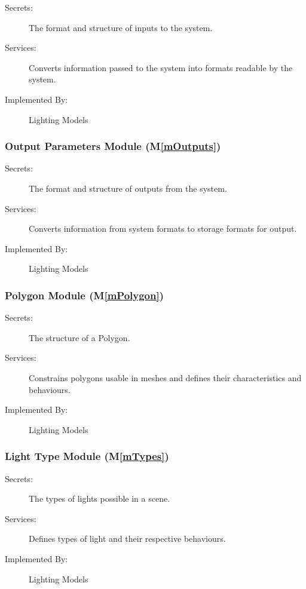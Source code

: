 \documentclass[12pt, titlepage]{article}
\newcommand{\mref}[1]{M\ref{#1}}
\begin{document}
\begin{description}
	\item[Secrets:]The format and structure of inputs to the system.
	\item[Services:]Converts information passed to the system into formats 
	readable by the system.
	\item[Implemented By:] Lighting Models
\end{description}

\subsubsection{Output Parameters Module (\mref{mOutputs})}

\begin{description}
	\item[Secrets:]The format and structure of outputs from the system.
	\item[Services:]Converts information from system formats to storage formats 
	for output.
	\item[Implemented By:] Lighting Models
\end{description}

\subsubsection{Polygon Module (\mref{mPolygon})}
\begin{description}
	\item[Secrets:]The structure of a Polygon.
	\item[Services:]Constrains polygons usable in meshes and defines their 
	characteristics and behaviours.
	\item[Implemented By:] Lighting Models
\end{description}

\subsubsection{Light Type Module (\mref{mTypes})}
\begin{description}
	\item[Secrets:]The types of lights possible in a scene.
	\item[Services:]Defines types of light and their respective behaviours.
	\item[Implemented By:] Lighting Models
\end{description}
\end{document}
